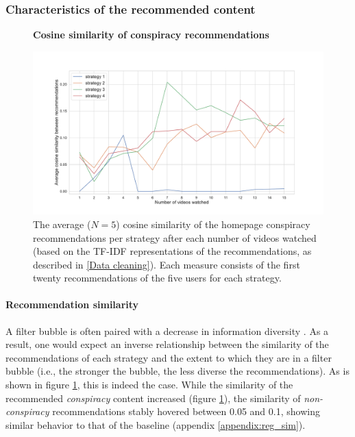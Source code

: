 \documentclass[../main.tex]{subfiles}
\begin{document}
\subsubsection{Characteristics of the recommended content}
\begin{figure}[t]
  \textbf{Cosine similarity of conspiracy recommendations}\par\medskip
  \centering
  \includegraphics[keepaspectratio, width=\textwidth]{images/Con sim.pdf}
  \caption{The average ($N = 5$) cosine similarity of the homepage conspiracy recommendations per strategy after each number of videos watched (based on the TF-IDF representations of the recommendations, as described in \ref{Data cleaning}). Each measure consists of the first twenty recommendations of the five users for each strategy.}
  \label{fig:con_similarities}
\end{figure}


\paragraph{Recommendation similarity}
A filter bubble is often paired with a decrease in information diversity \citep{nguyen2014exploring}. As a 
result, one would expect an inverse relationship between the similarity of the recommendations of each strategy 
and the extent to which they are in a filter bubble (i.e., the stronger the bubble, the less diverse the 
recommendations). As is shown in figure \ref{fig:con_similarities}, this is indeed the case. While the 
similarity of the recommended \textit{conspiracy} content increased (figure \ref{fig:con_similarities}), the 
similarity of \textit{non-conspiracy} recommendations stably hovered between 0.05 and 0.1, showing similar 
behavior to that of the baseline (appendix \ref{appendix:reg_sim}).
\end{document}
